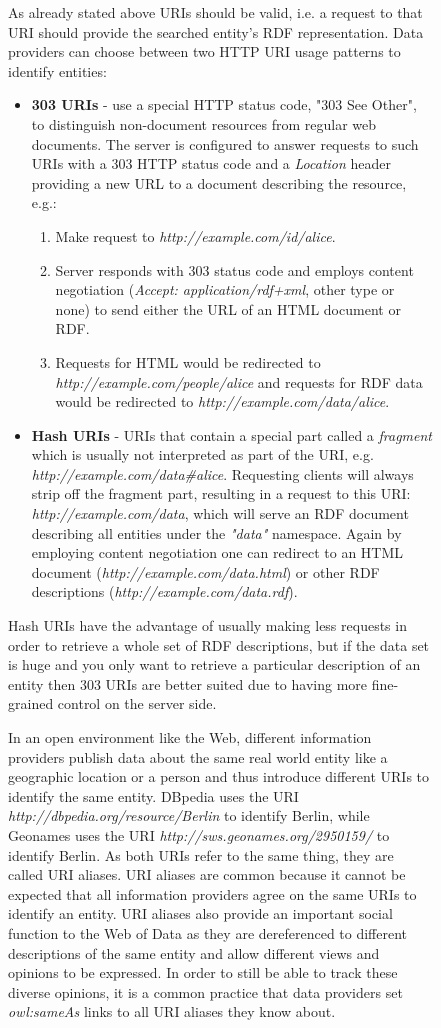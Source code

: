 \begin{figure}[h!]
As already stated above URIs should be valid, i.e. a request to that URI should provide the searched entity's RDF representation. Data providers can choose between two HTTP URI usage patterns to identify entities:
\begin{itemize}
    \item \textbf{303 URIs} - use a special HTTP status code, "303 See Other", to distinguish non-document resources from regular web documents. The server is configured to answer requests to such URIs with a 303 HTTP status code and a \textit{Location} header providing a new URL to a document describing the resource, e.g.:
    \begin{enumerate}
        \item Make request to \textit{http://example.com/id/alice}.
        \item Server responds with 303 status code and employs content negotiation (\textit{Accept: application/rdf+xml}, other type or none) to send either the URL of an HTML document or RDF.
        \item Requests for HTML would be redirected to \textit{http://example.com/people/alice} and requests for RDF data would be redirected to \textit{http://example.com/data/alice}.
    \end{enumerate}
    \item \textbf{Hash URIs} - URIs that contain a special part called a \textit{fragment} which is usually not interpreted as part of the URI, e.g. \textit{http://example.com/data\#alice}. Requesting clients will always strip off the fragment part, resulting in a request to this URI: \textit{http://example.com/data}, which will serve an RDF document describing all entities under the \textit{"data"} namespace. Again by employing content negotiation one can redirect to an HTML document (\textit{http://example.com/data.html}) or other RDF descriptions (\textit{http://example.com/data.rdf}).
\end{itemize}
Hash URIs have the advantage of usually making less requests in order to retrieve a whole set of RDF descriptions, but if the data set is huge and you only want to retrieve a particular description of an entity then 303 URIs are better suited due to having more fine-grained control on the server side.

In an open environment like the Web, different information providers publish data about the same real world entity like a geographic location or a person and thus introduce different URIs to identify the same entity. DBpedia uses the URI \textit{http://dbpedia.org/resource/Berlin} to identify Berlin, while Geonames uses the URI
\textit{http://sws.geonames.org/2950159/} to identify Berlin. As both URIs refer to the same thing, they are called URI aliases. URI aliases are common because it cannot be expected that all information providers agree on the same URIs to
identify an entity. URI aliases also provide an important social function to the Web of Data
as they are dereferenced to different descriptions of the same entity and allow different views and opinions to be expressed. In order to still be able to track these diverse opinions, it is a common
practice that data providers set \textit{owl:sameAs} links to all URI aliases they know about.


\end{figure}
